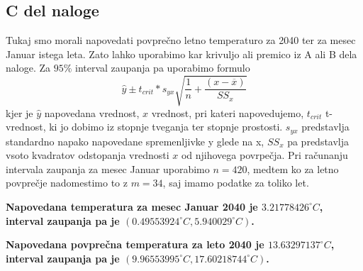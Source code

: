 \documentclass{article}
\begin{document}
    \subsection{C del naloge}
    Tukaj smo morali napovedati povprečno letno temperaturo za 2040 ter za mesec Januar istega leta. Zato lahko uporabimo kar krivuljo ali premico iz A ali B dela naloge. Za
    $95\%$ interval zaupanja pa uporabimo formulo
    \[
        \hat{y} \pm t_{crit} * s_{y x} \sqrt{\frac{1}{n} + \frac{(x - \overline{x})}{SS_{x}}}  
    \] 
    kjer je $\hat{y}$ napovedana vrednost, $x$ vrednost, pri kateri napovedujemo, $t_{crit}$ t-vrednost, ki jo dobimo iz stopnje tveganja ter stopnje prostosti. $s_{y x}$ predstavlja
    standardno napako napovedane spremenljivke y glede na x, $SS_{x}$ pa predstavlja vsoto kvadratov odstopanja vrednosti $x$ od njihovega povrpečja. Pri računanju intervala
    zaupanja za mesec Januar uporabimo $n = 420$, medtem ko za letno povprečje nadomestimo to z $m = 34$, saj imamo podatke za toliko let.
    \par \textbf{Napovedana temperatura za mesec Januar 2040 je $3.21778426^\circ C$, interval zaupanja pa je $(0.49553924^\circ C, 5.940029^\circ C)$.}
    \par \textbf{Napovedana povprečna temperatura za leto 2040 je $13.63297137^\circ C$, interval zaupanja pa je $(9.96553995^\circ C, 17.60218744^\circ C)$.}
\end{document}
